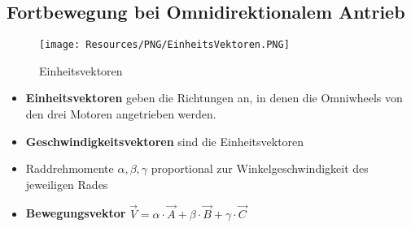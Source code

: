 \subsection{Fortbewegung bei Omnidirektionalem Antrieb}
\begin{figure}[H]
	\begin{center}
		\texttt{[image: Resources/PNG/EinheitsVektoren.PNG]}
		\caption{Einheitsvektoren}
		\label{fig:PNG/EinheitsVektoren.PNG}
	\end{center}
\end{figure}
\begin{itemize}
	\item \textbf{Einheitsvektoren} geben die Richtungen an, in denen die Omniwheels von den drei Motoren angetrieben werden.
	\item \textbf{Geschwindigkeitsvektoren} sind die Einheitsvektoren
	\item Raddrehmomente $\alpha, \beta, \gamma$ proportional zur Winkelgeschwindigkeit des jeweiligen Rades
	\item \textbf{Bewegungsvektor} $\vec{V}=\alpha \cdot \vec{A}+\beta \cdot \vec{B}+\gamma \cdot \vec{C}$
\end{itemize}

